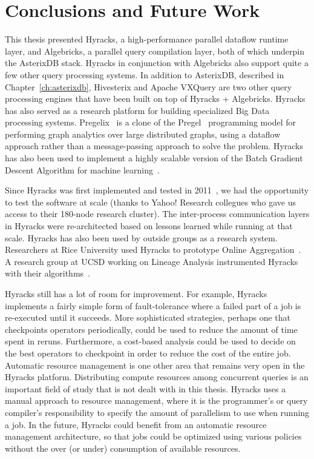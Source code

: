 \chapter{Conclusions and Future Work}
\label{ch:conclusions-and-future-work}

This thesis presented Hyracks, a high-performance parallel dataflow runtime layer, and Algebricks, a parallel query compilation layer, both of which underpin the AsterixDB stack. Hyracks in conjunction with Algebricks also support quite a few other query processing systems. In addition to AsterixDB, described in Chapter~\ref{ch:asterixdb}, Hivesterix and Apache VXQuery are two other query processing engines that have been built on top of Hyracks + Algebricks. Hyracks has also served as a research platform for building specialized Big Data processing systems. Pregelix~\cite{pregelix} is a clone of the Pregel~\cite{Pregel} programming model for performing graph analytics over large distributed graphs, using a dataflow approach rather than a message-passing approach to solve the problem. Hyracks has also been used to implement a highly scalable version of the Batch Gradient Descent Algorithm for machine learning~\cite{DBLP:journals/corr/abs-1303-3517}.

Since Hyracks was first implemented and tested in 2011~\cite{hyracks}, we had the opportunity to test the software at scale (thanks to Yahoo! Research collegues who gave us access to their 180-node research cluster). The inter-process communication layers in Hyracks were re-architected based on lessons learned while running at that scale. Hyracks has also been used by outside groups as a research system. Researchers at Rice University used Hyracks to prototype Online Aggregation~\cite{DBLP:journals/pvldb/PansareBJC11}. A research group at UCSD working on Lineage Analysis instrumented Hyracks with their algorithms~\cite{Logothetis:2013:SLC:2523616.2523619}.

Hyracks still has a lot of room for improvement. For example, Hyracks implements a fairly simple form of fault-tolerance where a failed part of a job is re-executed until it succeeds. More sophisticated strategies, perhaps one that checkpoints operators periodically, could be used to reduce the amount of time spent in reruns. Furthermore, a cost-based analysis could be used to decide on the best operators to checkpoint in order to reduce the cost of the entire job. Automatic resource management is one other area that remains very open in the Hyracks platform. Distributing compute resources among concurrent queries is an important field of study that is not dealt with in this thesis. Hyracks uses a manual approach to resource management, where it is the programmer's or query compiler's responsibility to specify the amount of parallelism to use when running a job. In the future, Hyracks could benefit from an automatic resource management architecture, so that jobs could be optimized using various policies without the over (or under) consumption of available resources.

